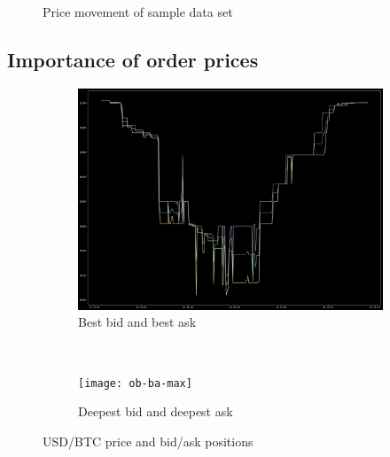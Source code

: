 \begin{figure}[H]
    \centering
    \caption{Price movement of sample data set}
    \label{fig:data-price-movement}
\end{figure}

\subsection{Importance of order prices}
\label{sec:data-hypthesis-order-price}

\begin{figure}[H]
    \centering
    \begin{subfigure}[b]{0.45\textwidth}
        \includegraphics[width=\textwidth]{images/ob-ba-min.png}
        \caption{Best bid and best ask}
        \label{fig:ob-ba-min}
    \end{subfigure}
    ~ %
    \begin{subfigure}[b]{0.45\textwidth}
        \texttt{[image: ob-ba-max]}
        \caption{Deepest bid and deepest ask}
        \label{fig:ob-ba-max}
    \end{subfigure}
    \caption{USD/BTC price and bid/ask positions}\label{fig:animals}
\end{figure}

